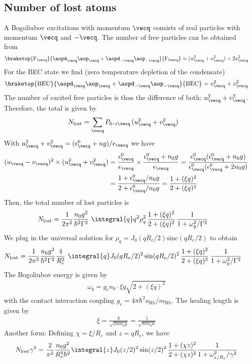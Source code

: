 \subsection{Number of lost atoms}
A Bogoliubov excitations with momentum $\vecq$ consists of real particles with momentum $\vecq$ and $-\vecq$. The number of free particles can be obtained from
\begin{align}
\braketop{\text{F}_{\vecq}}{\aopd_{\vecq}\aop_{\vecq}+\aopd_{-\vecq}\aop_{-\vecq}}{\text{F}_{\vecq}}=(u_{\vecq}^2+v_{\vecq}^2)+2v_{\vecq}^2
\end{align}
For the BEC state we find (zero temperature depletion of the condensate)
\begin{align}
\braketop{\text{BEC}}{\aopd_{\vecq}\aop_{\vecq}+\aopd_{-\vecq}\aop_{-\vecq}}{\text{BEC}}=v_{\vecq}^2+v_{\vecq}^2
\end{align}
The number of excited free particles is thus the difference of both: $u_{\vecq}^2+v_{\vecq}^2$. Therefore, the total is given by
\begin{align}
N_\text{lost} &= \sum_{\vecq} P_{0\rightarrow\vecq}\, (u_{\vecq}^2+v_{\vecq}^2)
\end{align}
With $u_{\vecq}^2+v_{\vecq}^2 = (\epsilon^0_{\vecq}+n g)/\epsilon_{\vecq}$ we have
\begin{align}
(u_{\vecq}-v_{\vecq})^2\times (u_{\vecq}^2+v_{\vecq}^2)&=\frac{\epsilon^0_{\vecq}}{\epsilon_{\vecq}} \times \frac{\epsilon^0_{\vecq}+n_0 g}{\epsilon_{\vecq}} = \frac{\epsilon^0_{\vecq}(\epsilon^0_{\vecq}+n_0 g)}{\epsilon^0_{\vecq}(\epsilon^0_{\vecq}+2n_0 g)}\\
&= \frac{1+\epsilon^0_{\vecq}/n_0 g}{2+\epsilon^0_{\vecq}/n_0 g}=\frac{1+(\xi q)^2}{2+(\xi q)^2}
\end{align}
Then, the total number of lost particles is
\begin{align}
N_\text{lost}&=\frac{1}{2\pi^2}\frac{n_0 g^2}{\hbar^2\Gamma^2}\ \integral{q} q^2\rho_q^2\,\frac{1+(\xi q)^2}{2+(\xi q)^2} \, \frac{1}{1+\omega_{q}^2/\Gamma^2}
\end{align}
We plug in the universal solution for $\rho_q=J_0(q R_e/2)\text{sinc}(q R_e/2)$ to obtain
\begin{align}
N_\text{lost}&=\frac{1}{2\pi^2} \frac{n_0 g^2}{\hbar^2\Gamma^2}\frac{4}{R_e^2} \ \integral{q} J_0(q R_e/2)^2 \sin(q R_e/2)^2 \,\frac{1+(\xi q)^2}{2+(\xi q)^2} \, \frac{1}{1+\omega_{q}^2/\Gamma^2}
\end{align}
The Bogoliubov energy is given by
\begin{align}
\omega_q=g_c n_0 \cdot \xi q \sqrt{2+(\xi q)^2}
\end{align}
with the contact interaction coupling $g_c=4\pi\hbar^2 a_\text{Rb}/m_\text{Rb}$. The healing length is given by
\begin{align}
\xi = \frac{\hbar}{\sqrt{2m n_0g}} = \frac{1}{\sqrt{8\pi n_0 a}}
\end{align}
Another form: Defining $\chi=\xi / R_e$ and $z = q R_e$, we have
\begin{align}
N_\text{lost}\gamma^2 = \frac{2}{\pi^2}\frac{n_0 g^2}{R_e^3 \hbar^2}\integral{z} J_0(z/2)^2 \sin(z/2)^2 \,\frac{1+(\chi z)^2}{2+(\chi z)^2} \frac{1}{1+\omega_{z/R_e}^2/\gamma^2}
\end{align}

